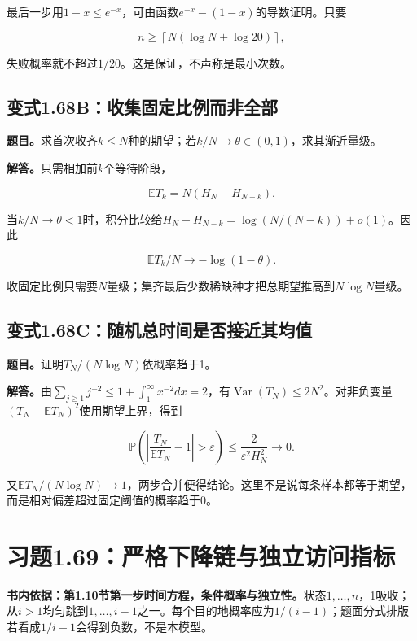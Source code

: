 \documentclass[
  11pt,a4paper,UTF8,fontset=fandol]{ctexart}
\begin{document}
最后一步用\(1-x\le e^{-x}\)，可由函数\(e^{-x}-(1-x)\)的导数证明。只要

\[\boxed{n\ge\left\lceil N(\log N+\log20)\right\rceil,}\]

失败概率就不超过\(1/20\)。这是保证，不声称是最小次数。

\subsection{变式1.68B：收集固定比例而非全部}\label{ux53d8ux5f0f1.68bux6536ux96c6ux56faux5b9aux6bd4ux4f8bux800cux975eux5168ux90e8}

\textbf{题目。}求首次收齐\(k\le N\)种的期望；若\(k/N\to\theta\in(0,1)\)，求其渐近量级。

\textbf{解答。}只需相加前\(k\)个等待阶段，

\[\boxed{\mathbb ET_k=N(H_N-H_{N-k}).}\]

当\(k/N\to\theta<1\)时，积分比较给\(H_N-H_{N-k}=\log(N/(N-k))+o(1)\)。因此

\[\boxed{\mathbb ET_k/N\longrightarrow-\log(1-\theta).}\]

收固定比例只需要\(N\)量级；集齐最后少数稀缺种才把总期望推高到\(N\log N\)量级。

\subsection{变式1.68C：随机总时间是否接近其均值}\label{ux53d8ux5f0f1.68cux968fux673aux603bux65f6ux95f4ux662fux5426ux63a5ux8fd1ux5176ux5747ux503c}

\textbf{题目。}证明\(T_N/(N\log N)\)依概率趋于1。

\textbf{解答。}由\(\sum_{j\ge1}j^{-2}\le1+\int_1^\infty x^{-2}dx=2\)，有\(\operatorname{Var}(T_N)\le2N^2\)。对非负变量\((T_N-\mathbb ET_N)^2\)使用期望上界，得到

\[\mathbb P\left(\left|\frac{T_N}{\mathbb ET_N}-1\right|>\varepsilon\right)
\le\frac{2}{\varepsilon^2H_N^2}\longrightarrow0.\]

又\(\mathbb ET_N/(N\log N)\to1\)，两步合并便得结论。这里不是说每条样本都等于期望，而是相对偏差超过固定阈值的概率趋于0。

\section{习题1.69：严格下降链与独立访问指标}\label{ux4e60ux98981.69ux4e25ux683cux4e0bux964dux94feux4e0eux72ecux7acbux8bbfux95eeux6307ux6807}

\textbf{书内依据：第1.10节第一步时间方程，条件概率与独立性。}状态\(1,\ldots,n\)，1吸收；从\(i>1\)均匀跳到\(1,\ldots,i-1\)之一。每个目的地概率应为\(1/(i-1)\)；题面分式排版若看成\(1/i-1\)会得到负数，不是本模型。
\end{document}
